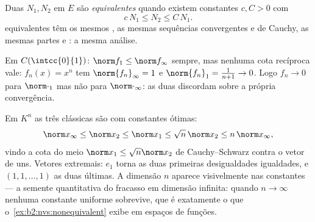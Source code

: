 \begin{definition}\label{def:b2:nvs:equivalent}
Duas  $N_1, N_2$ em $E$ são \emph{equivalentes} quando existem constantes $c, C > 0$ com
\[
c\,N_1 \leq N_2 \leq C\, N_1 .
\]
 equivalentes têm os mesmos , as mesmas sequências convergentes e
de Cauchy, as mesmas partes  e : a mesma
análise.
\end{definition}

\begin{example}\label{ex:b2:nvs:nonequivalent}
Em $C(\intcc{0}{1})$: $\norm f_1 \leq \norm f_\infty$ sempre, mas
nenhuma cota recíproca vale: $f_n(x) = x^n$ tem $\norm{f_n}_\infty = 1$
e $\norm{f_n}_1 = \frac{1}{n+1} \to 0$. Logo $f_n \to 0$ para
$\norm\cdot_1$ mas não para $\norm\cdot_\infty$: as duas 
discordam sobre a própria convergência.
\end{example}

\begin{example}\label{ex:b2:nvs:constants}
Em $K^n$ as três  clássicas são  com constantes
ótimas:
\[
\norm x_\infty \leq \norm x_2 \leq \norm x_1
\leq \sqrt n\,\norm x_2 \leq n\,\norm x_\infty ,
\]
vindo a cota do meio $\norm x_1 \leq \sqrt n\norm x_2$ de
Cauchy--Schwarz contra o vetor de uns. Vetores extremais:
$e_1$ torna as duas primeiras desigualdades igualdades, e $(1, 1,
\dots, 1)$ as duas últimas. A dimensão $n$ aparece visivelmente nas
constantes --- a semente quantitativa do fracasso em dimensão
infinita: quando $n \to \infty$ nenhuma constante uniforme sobrevive,
que é exatamente o que o~\cref{ex:b2:nvs:nonequivalent} exibe em
espaços de funções.
\end{example}

